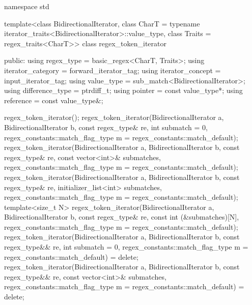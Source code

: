 \begin{codeblock}
namespace std {
  template<class BidirectionalIterator,
           class CharT = typename iterator_traits<BidirectionalIterator>::value_type,
           class Traits = regex_traits<CharT>>
    class regex_token_iterator {
    public:
      using regex_type        = basic_regex<CharT, Traits>;
      using iterator_category = forward_iterator_tag;
      using iterator_concept  = input_iterator_tag;
      using value_type        = sub_match<BidirectionalIterator>;
      using difference_type   = ptrdiff_t;
      using pointer           = const value_type*;
      using reference         = const value_type&;

      regex_token_iterator();
      regex_token_iterator(BidirectionalIterator a, BidirectionalIterator b,
                           const regex_type& re,
                           int submatch = 0,
                           regex_constants::match_flag_type m =
                             regex_constants::match_default);
      regex_token_iterator(BidirectionalIterator a, BidirectionalIterator b,
                           const regex_type& re,
                           const vector<int>& submatches,
                           regex_constants::match_flag_type m =
                             regex_constants::match_default);
      regex_token_iterator(BidirectionalIterator a, BidirectionalIterator b,
                           const regex_type& re,
                           initializer_list<int> submatches,
                           regex_constants::match_flag_type m =
                             regex_constants::match_default);
      template<size_t N>
        regex_token_iterator(BidirectionalIterator a, BidirectionalIterator b,
                             const regex_type& re,
                             const int (&submatches)[N],
                             regex_constants::match_flag_type m =
                               regex_constants::match_default);
      regex_token_iterator(BidirectionalIterator a, BidirectionalIterator b,
                           const regex_type&& re,
                           int submatch = 0,
                           regex_constants::match_flag_type m =
                             regex_constants::match_default) = delete;
      regex_token_iterator(BidirectionalIterator a, BidirectionalIterator b,
                           const regex_type&& re,
                           const vector<int>& submatches,
                           regex_constants::match_flag_type m =
                             regex_constants::match_default) = delete;
}}
\end{codeblock}
